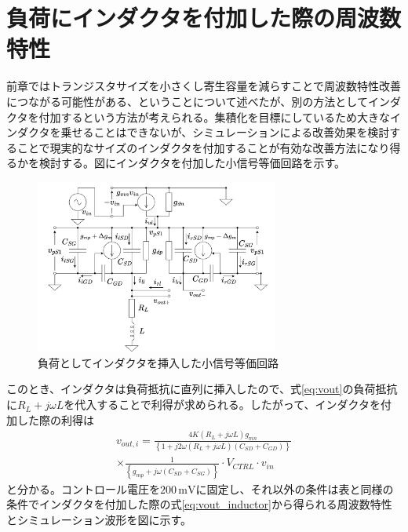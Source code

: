\documentclass[twocolumn]{jsarticle}
\begin{document}
\section{負荷にインダクタを付加した際の周波数特性}
    前章ではトランジスタサイズを小さくし寄生容量を減らすことで周波数特性改善につながる可能性がある、ということについて述べたが、別の方法としてインダクタを付加するという方法が考えられる。集積化を目標にしているため大きなインダクタを乗せることはできないが、シミュレーションによる改善効果を検討することで現実的なサイズのインダクタを付加することが有効な改善方法になり得るかを検討する。図にインダクタを付加した小信号等価回路を示す。
    \begin{figure}[H]
        \begin{center}
            \includegraphics*[width = 80mm]{figures/ParasiticInductorHalfEquivalent.png}
            \caption{負荷としてインダクタを挿入した小信号等価回路}
            \label{fig:inductor}
        \end{center}
    \end{figure}
    このとき、インダクタは負荷抵抗に直列に挿入したので、式\eqref{eq:vout}の負荷抵抗に$R_{L}+j\omega L$を代入することで利得が求められる。したがって、インダクタを付加した際の利得は
    \begin{multline}
        v_{out,i} = \frac{4K(R_{L}+j\omega L)g_{mn}}{ \left\{ 1+j2\omega(R_{L}+j\omega L)(C_{SD}+C_{GD}) \right\}}\\
        \times\frac{1}{\left\{ g_{mp}+j\omega(C_{SD}+C_{SG}) \right\}} \cdot V_{CTRL}\cdot v_{in}   \label{eq:vout_inductor}
    \end{multline}
    と分かる。コントロール電圧を$200\,\mathrm{mV}$に固定し、それ以外の条件は表と同様の条件でインダクタを付加した際の式\eqref{eq:vout_inductor}から得られる周波数特性とシミュレーション波形を図に示す。
\end{document}
